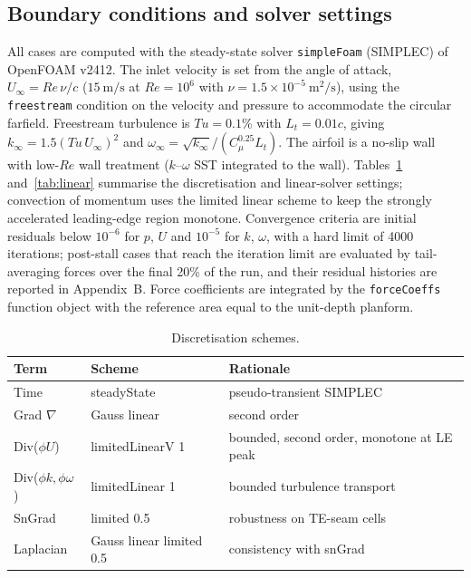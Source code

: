 \documentclass[11pt,a4paper]{article}
\begin{document}
\subsection{Boundary conditions and solver settings}
All cases are computed with the steady-state solver \texttt{simpleFoam} (SIMPLEC) of OpenFOAM v2412. The inlet velocity is set from the angle of attack, $U_\infty = Re\,\nu/c$ ($15~\mathrm{m/s}$ at $Re=10^6$ with $\nu = 1.5\times10^{-5}~\mathrm{m^2/s}$), using the \texttt{freestream} condition on the velocity and pressure to accommodate the circular farfield. Freestream turbulence is $Tu = 0.1\%$ with $L_t = 0.01c$, giving $k_\infty = 1.5(Tu\,U_\infty)^2$ and $\omega_\infty = \sqrt{k_\infty}/(C_\mu^{0.25} L_t)$. The airfoil is a no-slip wall with low-$Re$ wall treatment ($k$--$\omega$ SST integrated to the wall). Tables~\ref{tab:schemes} and~\ref{tab:linear} summarise the discretisation and linear-solver settings; convection of momentum uses the limited linear scheme to keep the strongly accelerated leading-edge region monotone. Convergence criteria are initial residuals below $10^{-6}$ for $p$, $U$ and $10^{-5}$ for $k$, $\omega$, with a hard limit of 4000 iterations; post-stall cases that reach the iteration limit are evaluated by tail-averaging forces over the final 20\% of the run, and their residual histories are reported in Appendix~B. Force coefficients are integrated by the \texttt{forceCoeffs} function object with the reference area equal to the unit-depth planform.

\begin{table}[t]
  \centering
  \caption{Discretisation schemes.}
  \label{tab:schemes}
  \begin{tabular}{lll}
    \toprule
    Term & Scheme & Rationale \\
    \midrule
    Time & steadyState & pseudo-transient SIMPLEC \\
    Grad $\nabla$ & Gauss linear & second order \\
    Div($\phi U$) & limitedLinearV 1 & bounded, second order, monotone at LE peak \\
    Div($\phi k, \phi\omega$) & limitedLinear 1 & bounded turbulence transport \\
    SnGrad & limited 0.5 & robustness on TE-seam cells \\
    Laplacian & Gauss linear limited 0.5 & consistency with snGrad \\
    \bottomrule
  \end{tabular}
\end{table}
\end{document}
